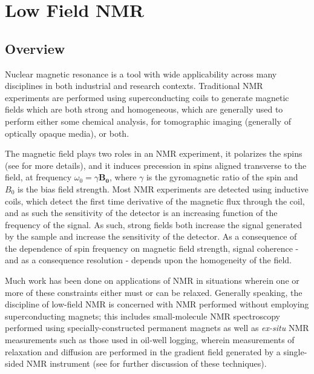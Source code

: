 \documentclass[PaulGanssle-Thesis.tex]{subfiles}
\begin{document}
\chapter{Low Field NMR}
\label{Chapter:NMR}
\section{Overview}
\label{nmr.overview}
Nuclear magnetic resonance is a tool with wide applicability across many disciplines in both industrial and research contexts. Traditional NMR experiments are performed using superconducting coils to generate magnetic fields which are both strong and homogeneous, which are generally used to perform either some chemical analysis, for tomographic imaging (generally of optically opaque media)\cite{Kumar1975,Kumar1975a,Mossle2006}, or both.\cite{Levitt2008}

The magnetic field plays two roles in an NMR experiment, it polarizes the spins (see  for more details), and it induces precession in spins aligned transverse to the field, at frequency $\omega_{0} = \gamma\mathbf{B_{0}}$, where $\gamma$ is the gyromagnetic ratio of the spin and $B_{0}$ is the bias field strength.\cite{Bloch1950,Hahn1950a} Most NMR experiments are detected using inductive coils, which detect the first time derivative of the magnetic flux through the coil, and as such the sensitivity of the detector is an increasing function of the frequency of the signal. As such, strong fields both increase the signal generated by the sample and increase the sensitivity of the detector.\cite{Savukov2007} As a consequence of the dependence of spin frequency on magnetic field strength, signal coherence - and as a consequence resolution - depends upon the homogeneity of the field.\cite{Bloom1955,hurlimann-jmr-2001}

Much work has been done on applications of NMR in situations wherein one or more of these constraints either must or can be relaxed. Generally speaking, the discipline of low-field NMR is concerned with NMR performed without employing superconducting magnets; this includes small-molecule NMR spectroscopy\cite{Moresi2003} performed using specially-constructed permanent magnets as well as \textit{ex-situ} NMR measurements such as those used in oil-well logging,\cite{kleinberg-cmr-2001,hurlimann-emr-2012} wherein measurements of relaxation and diffusion are performed in the gradient field generated by a single-sided NMR instrument\cite{single-sided-nmr,blumich-mri-mouse-1998,guthausen-jaocs-2004} (see  for further discussion of these techniques).
\end{document}
